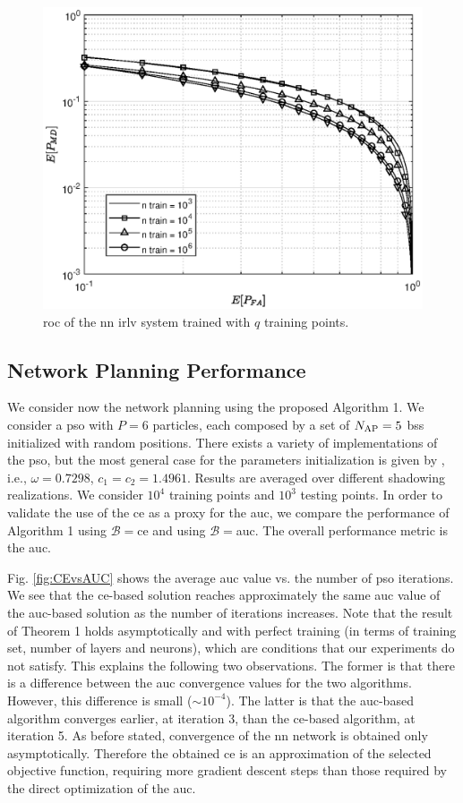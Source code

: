 \documentclass[conference,draftcls,onecolumn]{IEEEtran}
\begin{document}
\begin{figure}[t]
    \centering
    \includegraphics[width=0.9\columnwidth]{mean_maps_2.eps}
    \caption{\ac{roc} of the \ac{nn} \ac{irlv} system trained with $q$ training points.}
    \label{fig:n_train}
\end{figure}

\subsection{Network Planning Performance}

We consider now the network planning using the proposed Algorithm 1. We consider a \ac{pso} with $P=6$ particles, each composed by a set of $N_{\rm AP}=5$ \acp{bs} initialized with random positions. There exists a variety of implementations of the \ac{pso}, but the most general case for the parameters initialization is given by \cite{clerc2002}, i.e.,   $\omega=0.7298$, $c_1=c_2=1.4961$. Results are averaged over different shadowing realizations. We consider $10^4$ training  points and  $10^3$ testing points. In order to validate the use of the \ac{ce} as a proxy for the \ac{auc}, we compare the performance of Algorithm 1 using $\mathcal{B}=$\ac{ce} and using $\mathcal{B}=$\ac{auc}. The overall performance metric is the \ac{auc}.

Fig. \ref{fig:CEvsAUC} shows the average \ac{auc} value vs. the number of \ac{pso} iterations. We see that the \ac{ce}-based solution reaches approximately the same  \ac{auc} value of the \ac{auc}-based solution as the number of iterations increases. 
Note that the result of Theorem 1 holds asymptotically and with perfect training (in terms of training set, number of layers and neurons), which are conditions that our experiments do not satisfy. This explains the following two observations. The former is that there is a  difference between the \ac{auc} convergence values for the two algorithms. However, this difference is small ($\sim 10^{-4}$). The latter is that the \ac{auc}-based algorithm converges earlier, at iteration 3, than the \ac{ce}-based algorithm, at iteration 5. As before stated, convergence of the \ac{nn} network is obtained only asymptotically. Therefore the obtained \ac{ce} is an approximation of the selected objective function, requiring more gradient descent steps than those required by the direct optimization of the \ac{auc}.   
\end{document}
